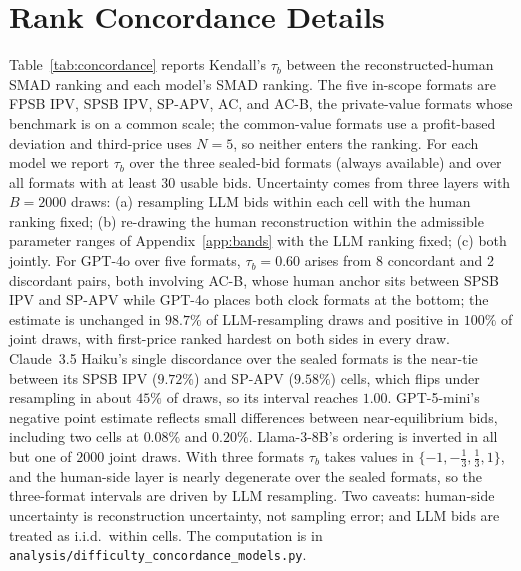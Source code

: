 \documentclass{article} %
\newif\ifmarkrev
\newcommand{\rev}[1]{\ifmarkrev\begingroup\color{red}#1\endgroup\else#1\fi}
\begin{document}
\begin{table}[htbp]
\centering
\small
\rev{\resizebox{\linewidth}{!}{}}
\caption{\rev{Direction of deviating bids by model and format: percentage of underbids / overbids among bids outside the $\pm 2\%$ band around the theoretical benchmark, with the within-band share and $n$ below. $^{\dagger}$: fewer than 30 usable bids; DS$^{\ddagger}$: GPT-5-mini states the dominant strategy outright and does not complete the clock procedure; no bids recorded.}}
\label{tab:direction_models}
\end{table}

\newpage

\section{\texorpdfstring{\rev{Rank Concordance Details}}{Rank Concordance Details}}\label{app:concordance}

\rev{Table~\ref{tab:concordance} reports Kendall's $\tau_b$ between the reconstructed-human SMAD ranking and each model's SMAD ranking. The five in-scope formats are FPSB IPV, SPSB IPV, SP-APV, AC, and AC-B, the private-value formats whose benchmark is on a common scale; the common-value formats use a profit-based deviation and third-price uses $N=5$, so neither enters the ranking. For each model we report $\tau_b$ over the three sealed-bid formats (always available) and over all formats with at least 30 usable bids. Uncertainty comes from three layers with $B=2000$ draws: (a) resampling LLM bids within each cell with the human ranking fixed; (b) re-drawing the human reconstruction within the admissible parameter ranges of Appendix~\ref{app:bands} with the LLM ranking fixed; (c) both jointly. For GPT-4o over five formats, $\tau_b = 0.60$ arises from 8 concordant and 2 discordant pairs, both involving AC-B, whose human anchor sits between SPSB IPV and SP-APV while GPT-4o places both clock formats at the bottom; the estimate is unchanged in $98.7\%$ of LLM-resampling draws and positive in $100\%$ of joint draws, with first-price ranked hardest on both sides in every draw. Claude~3.5 Haiku's single discordance over the sealed formats is the near-tie between its SPSB IPV ($9.72\%$) and SP-APV ($9.58\%$) cells, which flips under resampling in about $45\%$ of draws, so its interval reaches $1.00$. GPT-5-mini's negative point estimate reflects small differences between near-equilibrium bids, including two cells at $0.08\%$ and $0.20\%$. Llama-3-8B's ordering is inverted in all but one of $2000$ joint draws. With three formats $\tau_b$ takes values in $\{-1, -\tfrac13, \tfrac13, 1\}$, and the human-side layer is nearly degenerate over the sealed formats, so the three-format intervals are driven by LLM resampling. Two caveats: human-side uncertainty is reconstruction uncertainty, not sampling error; and LLM bids are treated as i.i.d.\ within cells. The computation is in \texttt{analysis/difficulty\_concordance\_models.py}.}
\end{document}
